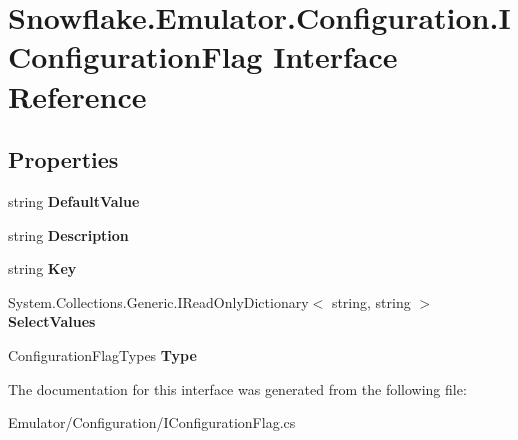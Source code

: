 \hypertarget{interface_snowflake_1_1_emulator_1_1_configuration_1_1_i_configuration_flag}{}\section{Snowflake.\+Emulator.\+Configuration.\+I\+Configuration\+Flag Interface Reference}
\label{interface_snowflake_1_1_emulator_1_1_configuration_1_1_i_configuration_flag}
\subsection*{Properties}
\begin{DoxyCompactItemize}
\item 
\hypertarget{interface_snowflake_1_1_emulator_1_1_configuration_1_1_i_configuration_flag_a6da03b500bfba79052a89c1397aab13c}{}string {\bfseries Default\+Value}\label{interface_snowflake_1_1_emulator_1_1_configuration_1_1_i_configuration_flag_a6da03b500bfba79052a89c1397aab13c}

\item 
\hypertarget{interface_snowflake_1_1_emulator_1_1_configuration_1_1_i_configuration_flag_a5005536a35465e1e3f067e15d1e7eddc}{}string {\bfseries Description}\label{interface_snowflake_1_1_emulator_1_1_configuration_1_1_i_configuration_flag_a5005536a35465e1e3f067e15d1e7eddc}

\item 
\hypertarget{interface_snowflake_1_1_emulator_1_1_configuration_1_1_i_configuration_flag_a3c8a0764069a4c7573a1ee324a49e382}{}string {\bfseries Key}\label{interface_snowflake_1_1_emulator_1_1_configuration_1_1_i_configuration_flag_a3c8a0764069a4c7573a1ee324a49e382}

\item 
\hypertarget{interface_snowflake_1_1_emulator_1_1_configuration_1_1_i_configuration_flag_a24b9e9b023e07a9114187e5352df8813}{}System.\+Collections.\+Generic.\+I\+Read\+Only\+Dictionary$<$ string, string $>$ {\bfseries Select\+Values}\label{interface_snowflake_1_1_emulator_1_1_configuration_1_1_i_configuration_flag_a24b9e9b023e07a9114187e5352df8813}

\item 
\hypertarget{interface_snowflake_1_1_emulator_1_1_configuration_1_1_i_configuration_flag_a4b00a2a68757af1acba0fd0712583cc0}{}Configuration\+Flag\+Types {\bfseries Type}\label{interface_snowflake_1_1_emulator_1_1_configuration_1_1_i_configuration_flag_a4b00a2a68757af1acba0fd0712583cc0}

\end{DoxyCompactItemize}


The documentation for this interface was generated from the following file\+:\begin{DoxyCompactItemize}
\item 
Emulator/\+Configuration/I\+Configuration\+Flag.\+cs\end{DoxyCompactItemize}
